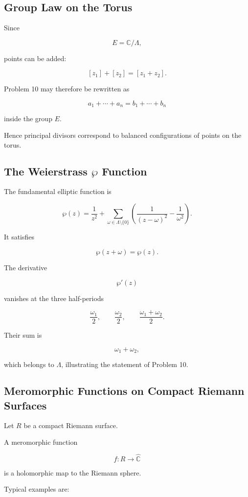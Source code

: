 \documentclass[12pt,a4paper]{article}
\theoremstyle{notespace}
\begin{document}
\subsection{Group Law on the Torus}

Since

\[
E=\mathbb C/\Lambda,
\]

points can be added:

\[
[z_1]+[z_2]
=
[z_1+z_2].
\]

Problem 10 may therefore be rewritten as

\[
a_1+\cdots+a_n
=
b_1+\cdots+b_n
\]

inside the group \(E\).

Hence principal divisors correspond to balanced configurations of points on the torus.

\subsection{The Weierstrass \texorpdfstring{\(\wp\)}{wp} Function}

The fundamental elliptic function is

\[
\wp(z)
=
\frac1{z^2}
+
\sum_{\omega\in\Lambda\setminus\{0\}}
\left(
\frac1{(z-\omega)^2}
-
\frac1{\omega^2}
\right).
\]

It satisfies

\[
\wp(z+\omega)=\wp(z).
\]

The derivative

\[
\wp'(z)
\]

vanishes at the three half-periods

\[
\frac{\omega_1}{2},
\qquad
\frac{\omega_2}{2},
\qquad
\frac{\omega_1+\omega_2}{2}.
\]

Their sum is

\[
\omega_1+\omega_2,
\]

which belongs to \(\Lambda\), illustrating the statement of Problem 10.

\subsection{Meromorphic Functions on Compact Riemann Surfaces}

Let \(R\) be a compact Riemann surface.

A meromorphic function

\[
f:R\to\widehat{\mathbb C}
\]

is a holomorphic map to the Riemann sphere.

Typical examples are:
\end{document}
